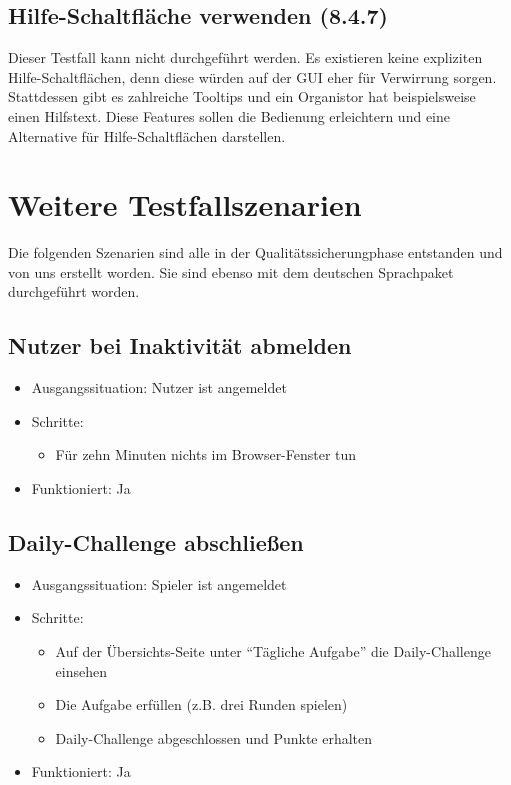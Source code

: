 \documentclass[a4paper]{scrreprt}
\begin{document}
            \subsection{Hilfe-Schaltfläche verwenden (8.4.7)}
            Dieser Testfall kann nicht durchgeführt werden. Es existieren keine expliziten Hilfe-Schaltflächen, denn diese würden auf der GUI eher für Verwirrung sorgen.
            Stattdessen gibt es zahlreiche Tooltips und ein Organistor hat beispielsweise einen Hilfstext. Diese Features sollen die Bedienung erleichtern und eine Alternative für Hilfe-Schaltflächen darstellen.


    \newpage

        \section{Weitere Testfallszenarien}
        Die folgenden Szenarien sind alle in der Qualitätssicherungphase entstanden und von uns erstellt worden. Sie sind ebenso mit dem deutschen Sprachpaket durchgeführt worden.

            \subsection{Nutzer bei Inaktivität abmelden}
            \begin{itemize}
                \item Ausgangssituation: Nutzer ist angemeldet
                \item Schritte:
                    \begin{itemize}
                        \item Für zehn Minuten nichts im Browser-Fenster tun
                    \end{itemize}
                \item Funktioniert: Ja
            \end{itemize}

            \subsection{Daily-Challenge abschließen}
            \begin{itemize}
                \item Ausgangssituation: Spieler ist angemeldet
                \item Schritte:
                    \begin{itemize}
                        \item Auf der Übersichts-Seite unter \enquote{Tägliche Aufgabe} die Daily-Challenge einsehen
                        \item Die Aufgabe erfüllen (z.B. drei Runden spielen)
                        \item Daily-Challenge abgeschlossen und Punkte erhalten
                    \end{itemize}
                \item Funktioniert: Ja
            \end{itemize}
\end{document}
